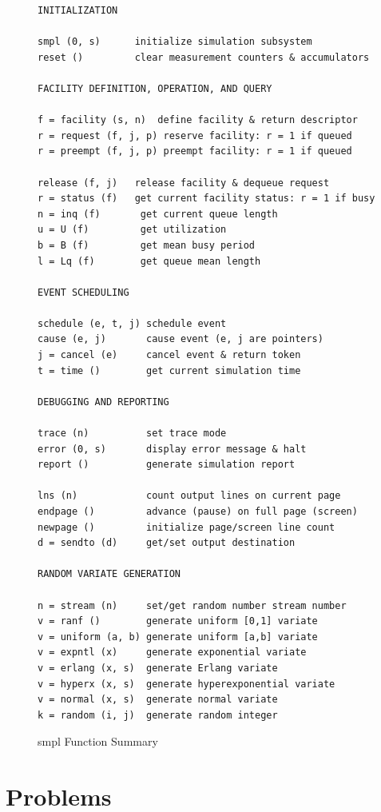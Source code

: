 \begin{figure}[ht]
\centering
\begingroup\small
\begin{verbatim}
INITIALIZATION

smpl (0, s)      initialize simulation subsystem
reset ()         clear measurement counters & accumulators

FACILITY DEFINITION, OPERATION, AND QUERY

f = facility (s, n)  define facility & return descriptor
r = request (f, j, p) reserve facility: r = 1 if queued
r = preempt (f, j, p) preempt facility: r = 1 if queued

release (f, j)   release facility & dequeue request
r = status (f)   get current facility status: r = 1 if busy
n = inq (f)       get current queue length
u = U (f)         get utilization
b = B (f)         get mean busy period
l = Lq (f)        get queue mean length

EVENT SCHEDULING

schedule (e, t, j) schedule event
cause (e, j)       cause event (e, j are pointers)
j = cancel (e)     cancel event & return token
t = time ()        get current simulation time

DEBUGGING AND REPORTING

trace (n)          set trace mode
error (0, s)       display error message & halt
report ()          generate simulation report

lns (n)            count output lines on current page
endpage ()         advance (pause) on full page (screen)
newpage ()         initialize page/screen line count
d = sendto (d)     get/set output destination

RANDOM VARIATE GENERATION

n = stream (n)     set/get random number stream number
v = ranf ()        generate uniform [0,1] variate
v = uniform (a, b) generate uniform [a,b] variate
v = expntl (x)     generate exponential variate
v = erlang (x, s)  generate Erlang variate
v = hyperx (x, s)  generate hyperexponential variate
v = normal (x, s)  generate normal variate
k = random (i, j)  generate random integer
\end{verbatim}
\endgroup
\caption{smpl Function Summary}
\end{figure}

\section{Problems}
\label{sec:smpl-problems}


